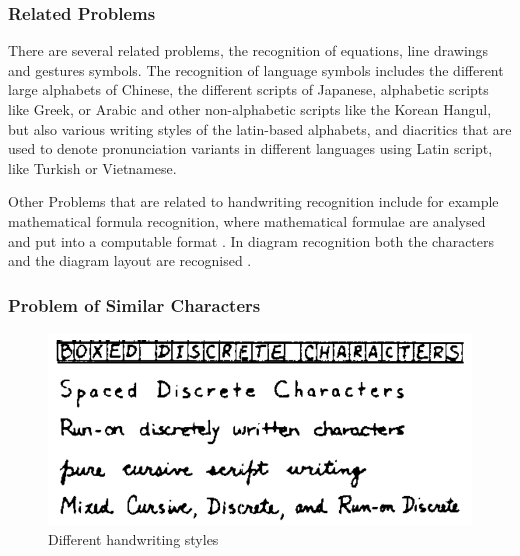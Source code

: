 \subsubsection{Related Problems}
\label{sec:relatedproblems}

There are several related problems, the recognition of equations, line 
drawings and gestures symbols. The recognition of language symbols includes 
the different large alphabets of Chinese, the different scripts of Japanese, 
alphabetic scripts like Greek, or Arabic and other non-alphabetic scripts like
the Korean  Hangul, but also various writing styles of the latin-based 
alphabets, and diacritics that are used to denote pronunciation variants in 
different languages using Latin script, like Turkish or Vietnamese.

Other Problems that are related to handwriting recognition include for example
mathematical formula recognition, where mathematical formulae are analysed and 
put into a computable format . In diagram recognition 
both the characters and the diagram layout are recognised 
.

\subsubsection{Problem of Similar Characters}
\label{sec:similarcharacters}

\begin{figure}[htbp]
\includegraphics[scale=0.5]{images/differentHandwritingStyles.png}
\caption{Different handwriting styles}
\label{fig:differenthandwritingstyles}
\end{figure}


